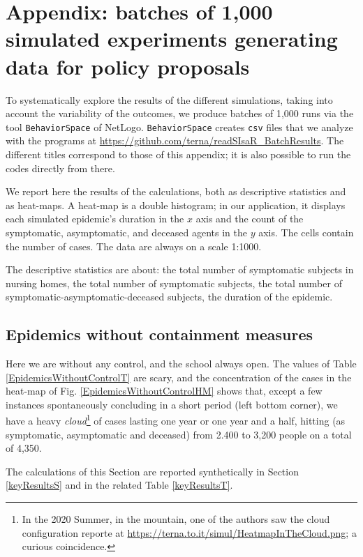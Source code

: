 \documentclass[11pt]{article}
\begin{document}
\section{Appendix: batches of 1,000 simulated experiments generating data for policy proposals}
\label{app1000run}

To systematically explore the results of the different simulations, taking into account the variability of the outcomes, we produce batches of 1,000 runs via the tool \verb|BehaviorSpace| of NetLogo. \verb|BehaviorSpace| creates \verb|csv| files that we analyze with the programs at 
\url{https://github.com/terna/readSIsaR_BatchResults}. The different titles correspond to those of this appendix; it is also possible to run the codes directly from there.

We report here the results of the calculations, both as descriptive statistics and as heat-maps. A heat-map is a double histogram; in our application, it displays each simulated epidemic's duration in the $x$ axis and the count of the symptomatic, asymptomatic, and deceased agents in the $y$ axis. The cells contain the number of cases. The data are always on a scale 1:1000.

The descriptive statistics are about: the total number of symptomatic subjects in nursing homes, the total number of symptomatic subjects, the total number of symptomatic-asymptomatic-deceased subjects, the duration of the epidemic.

\subsection{Epidemics without containment measures}
\label{EpidemicsWithoutControlS}

Here we are without any control, and the school always open. The values of Table \ref{EpidemicsWithoutControlT} are scary, and the concentration of the cases in the heat-map of Fig. \ref{EpidemicsWithoutControlHM} shows that, except a few instances spontaneously concluding in a short period (left bottom corner), we have a heavy \emph{cloud}\footnote{In the 2020 Summer, in the mountain, one of the authors saw the cloud configuration reporte at \url{https://terna.to.it/simul/HeatmapInTheCloud.png}; a curious coincidence.} of cases lasting one year or one year and a half, hitting (as symptomatic, asymptomatic and deceased) from 2.400 to 3,200 people on a total of 4,350.

The calculations of this Section are reported synthetically in Section \ref{keyResultsS} and in the related Table \ref{keyResultsT}.
\end{document}
